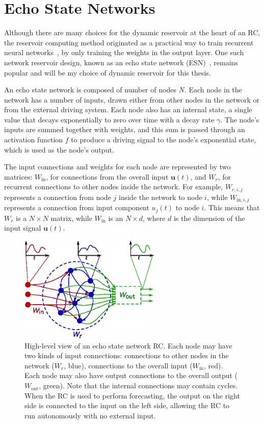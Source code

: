 \section{Echo State Networks}\label{sec:esn}

Although there are many choices for the dynamic reservoir at the heart
of an RC, the reservoir computing method originated as a practical way
to train recurrent neural networks~\cite{lukosevicius2009}, by only
training the weights in the output layer. One such network reservoir
design, known as an echo state network (ESN)~\cite{jaeger2001},
remains popular and will be my choice of dynamic reservoir for this
thesis.

An echo state network is composed of number of nodes $N$. Each node in
the network has a number of inputs, drawn either from other nodes in
the network or from the external driving system. Each node also has an
internal state, a single value that decays exponentially to zero over
time with a decay rate $\gamma$. The node's inputs are summed together
with weights, and this sum is passed through an activation function
$f$ to produce a driving signal to the node's exponential state, which
is used as the node's output.

The input connections and weights for each node are represented by two
matrices: $W_\text{in}$, for connections from the overall input
$\bm{u}(t)$, and $W_r$, for recurrent connections to other nodes
inside the network. For example, $W_{r,i,j}$ represents a connection
from node $j$ inside the network to node $i$, while
$W_{\text{in},i,j}$ represents a connection from input component
$u_j(t)$ to node $i$. This means that $W_r$ is a $N \times N$ matrix,
while $W_\text{in}$ is an $N \times d$, where $d$ is the dimension of
the input signal $\bm{u}(t)$.

\begin{figure}
  \includegraphics[width=0.6\textwidth]{figures/reservoir}
  \caption{High-level view of an echo state network RC. Each node may
    have two kinds of input connections: connections to other nodes in
    the network ($W_r$, blue), connections to the overall input
    ($W_\text{in}$, red). Each node may also have output connections
    to the overall output ($W_\text{out}$, green). Note that the
    internal connections may contain cycles.  When the RC is used to
    perform forecasting, the output on the right side is connected to
    the input on the left side, allowing the RC to run autonomously
    with no external input.}%
  \label{fig:reservoir}
\end{figure}

